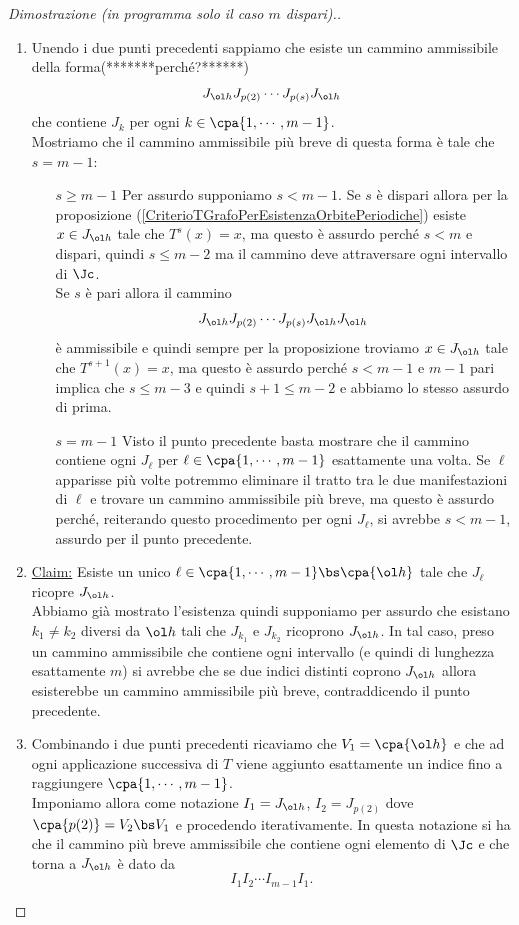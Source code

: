 \begin{proof}[Dimostrazione (in programma solo il caso $m$ dispari).]
\begin{enumerate}
Abbiamo quindi diviso i punti esattamente a met\`a, ma questo \`e assurdo perch\'e $m$ dispari.
\item Unendo i due punti precedenti sappiamo che esiste un cammino ammissibile della forma(*******perch\'e?******)
\[J_{\ol h}J_{p(2)}\cdots J_{p(s)}J_{\ol h}\]
che contiene $J_k$ per ogni $k\in\cpa{1,\cdots,m-1}$.\\
Mostriamo che il cammino ammissibile pi\`u breve di questa forma \`e tale che $s=m-1$:
\setlength{\leftmargini}{0cm}
\begin{itemize}
\item[$\boxed{s\geq m-1}$] Per assurdo supponiamo $s<m-1$. Se $s$ \`e dispari allora per la proposizione (\ref{CriterioTGrafoPerEsistenzaOrbitePeriodiche}) esiste $x\in J_{\ol h}$ tale che $T^s(x)=x$, ma questo \`e assurdo perch\'e $s<m$ e dispari, quindi $s\leq m-2$ ma il cammino deve attraversare ogni intervallo di $\Jc$.\\
Se $s$ \`e pari allora il cammino 
\[J_{\ol h}J_{p(2)}\cdots J_{p(s)}J_{\ol h}J_{\ol h}\]
\`e ammissibile e quindi sempre per la proposizione troviamo $x\in J_{\ol h}$ tale che $T^{s+1}(x)=x$, ma questo \`e assurdo perch\'e $s<m-1$ e $m-1$ pari implica che $s\leq m-3$ e quindi $s+1\leq m-2$ e abbiamo lo stesso assurdo di prima.
\item[$\boxed{s=m-1}$] Visto il punto precedente basta mostrare che il cammino contiene ogni $J_{\ell}$ per $\ell\in\cpa{1,\cdots, m-1}$ esattamente una volta. Se $\ell$ apparisse pi\`u volte potremmo eliminare il tratto tra le due manifestazioni di $\ell$ e trovare un cammino ammissibile pi\`u breve, ma questo \`e assurdo perch\'e, reiterando questo procedimento per ogni $J_\ell$, si avrebbe $s<m-1$, assurdo per il punto precedente.
\end{itemize}
\setlength{\leftmargini}{0.5cm}

\item \underline{Claim:} Esiste un unico $\ell\in\cpa{1,\cdots,m-1}\bs\cpa{\ol h}$ tale che $J_\ell$ ricopre $J_{\ol h}$.\\
Abbiamo gi\`a mostrato l'esistenza quindi supponiamo per assurdo che esistano $k_1\neq k_2$ diversi da $\ol h$ tali che $J_{k_1}$ e $J_{k_2}$ ricoprono $J_{\ol h}$. In tal caso, preso un cammino ammissibile che contiene ogni intervallo (e quindi di lunghezza esattamente $m$) si avrebbe che se due indici distinti coprono $J_{\ol h}$ allora esisterebbe un cammino ammissibile pi\`u breve, contraddicendo il punto precedente.

\item Combinando i due punti precedenti ricaviamo che $V_1=\cpa{\ol h}$ e che ad ogni applicazione successiva di $T$ viene aggiunto esattamente un indice fino a raggiungere $\cpa{1,\cdots, m-1}$.\\
Imponiamo allora come notazione $I_1=J_{\ol h}$, $I_2=J_{p(2)}$ dove $\cpa{p(2)}=V_2\bs V_1$ e procedendo iterativamente. In questa notazione si ha che il cammino pi\`u breve ammissibile che contiene ogni elemento di $\Jc$ e che torna a $J_{\ol h}$ \`e dato da
\[I_1I_2\cdots I_{m-1}I_1.\]


\end{enumerate}
\end{proof}
